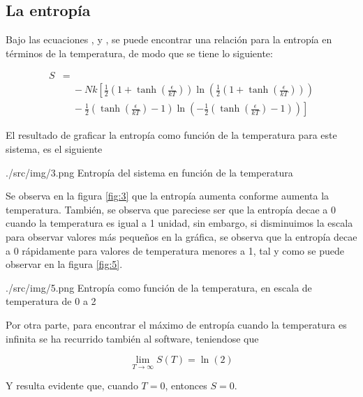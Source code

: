 \subsection{La entropía}
Bajo las ecuaciones ,  y , se puede encontrar una relación para la entropía en términos de la temperatura, de modo que se tiene lo siguiente:

{\scriptsize 
\begin{equation}
    \begin{split}
        S &= \\
            &\quad -Nk\left[
            \frac{1}{2} \left( 1+\tanh{\left( \frac{\epsilon}{kT} \right)} \right)
                \ln\left( \frac{1}{2} \left( 1 + \tanh{\left( \frac{\epsilon}{kT} \right)} \right) \right) \right. \\
            &\quad - \left. \frac{1}{2} \left( \tanh{\left( \frac{\epsilon}{kT} \right)} - 1 \right)
                \ln\left( -\frac{1}{2} \left( \tanh{\left( \frac{\epsilon}{kT} \right)} - 1 \right) \right)
        \right]
    \end{split}
\end{equation}
}

El resultado de graficar la entropía como función de la temperatura para este sistema, es el siguiente

\imagen
{./src/img/3.png}
{Entropía del sistema en función de la temperatura}
{\label{fig:3}}

Se observa en la figura \ref{fig:3} que la entropía aumenta conforme aumenta la temperatura. También, se observa que pareciese ser que la entropía decae a 0 cuando la temperatura es igual a 1 unidad, sin embargo, si disminuimos la escala para observar valores más pequeños en la gráfica, se observa que la entropía decae a 0 rápidamente para valores de temperatura menores a 1, tal y como se puede observar en la figura \ref{fig:5}.

\imagen
{./src/img/5.png}
{Entropía como función de la temperatura, en escala de temperatura de 0 a 2}
{\label{fig:5}}

Por otra parte, para encontrar el máximo de entropía cuando la temperatura es infinita se ha recurrido también al software, teniendose que

\begin{equation}
    \lim_{T \to \infty} S\left(T\right) = \ln{(2)}
\end{equation}

Y resulta evidente que, cuando $T = 0$, entonces $S = 0$.


